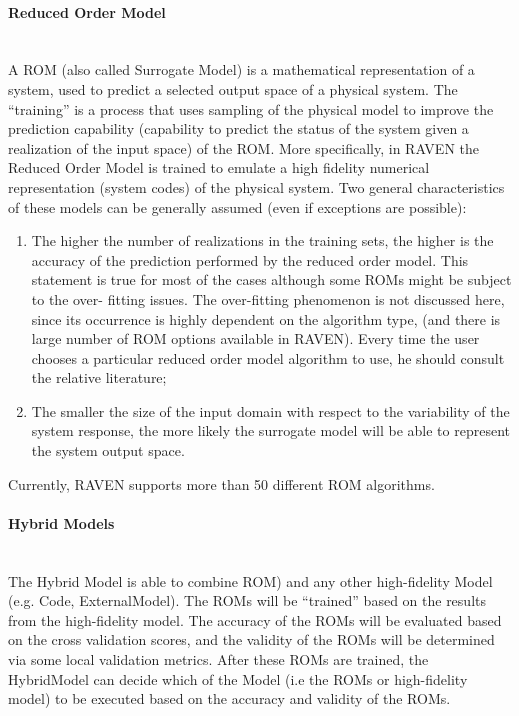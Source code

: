 \paragraph{Reduced Order Model} ~\\
 A ROM (also called Surrogate Model) is a mathematical representation of a system, used to predict a selected output 
 space of a physical system.
The ``training'' is a process that uses sampling of the physical model to improve the prediction capability (capability to 
predict the status of the system given a realization of the input space) of the ROM. More specifically, in RAVEN the 
Reduced Order Model is trained to emulate a high fidelity numerical representation (system codes) of the physical system. 
Two general characteristics of these models can be generally assumed (even if exceptions are possible):
\begin{enumerate}
   \item The higher the number of realizations in the training sets, the higher is the accuracy of the prediction performed by 
   the reduced order model. This statement is true for most of the cases although some ROMs might be subject to the over-
   fitting issues. The over-fitting phenomenon is not discussed here, since its occurrence is highly dependent on the 
   algorithm type, (and there is large number of ROM options available in RAVEN). Every time the user chooses a particular 
   reduced order model algorithm to use, he should consult the relative literature;
   \item The smaller the size of the input domain with respect to the variability of the system response, the more likely the 
   surrogate model will be able to represent the system output space.
\end{enumerate}
Currently, RAVEN supports more than 50 different ROM algorithms. 

\paragraph{Hybrid Models} ~\\
The Hybrid Model is able to combine ROM) and any other high-fidelity Model (e.g. Code, ExternalModel). 
The ROMs will be 
``trained'' based on the results from the high-fidelity model. The accuracy of the ROMs will be evaluated based on the 
cross validation scores, and the validity of the ROMs will be determined via some local validation metrics. After these 
ROMs are trained, the HybridModel can decide which of the Model (i.e the ROMs or  high-fidelity model) to be executed 
based on the accuracy and validity of the ROMs.

